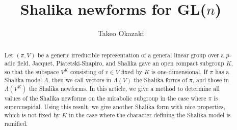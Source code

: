 \documentclass[11pt]{amsart}
\newcommand\1{\mathbf{1}}
\numberwithin{equation}{section}
\begin{document}
\title{Shalika newforms for GL($n$)}

\dedicatory{}

\author{Takeo Okazaki}



\maketitle

\begin{abstract}
Let $(\pi,V)$ be a generic irreducible representation of a general linear group over a $p$-adic field.
Jacquet, Piatetski-Shapiro, and Shalika gave an open compact subgroup $K$, so that the subspace $V^{K}$ consisting of $v \in V$ fixed by $K$ is one-dimensional.
If $\pi$ has a Shalika model $\Lambda$, then we call vectors in $\Lambda(V)$ the Shalika forms of $\pi$, and those in $\Lambda(V^{K})$ the Shalika newforms.
In this article, we give a method to determine all values of the Shalika newforms on the mirabolic subgroup in the case where $\pi$ is supercuspidal.
Using this result, we give another Shalika form with nice properties, which is not fixed by $K$ in the case where the character defining the Shalika model is ramified.
\end{abstract}

\tableofcontents
\end{document}
